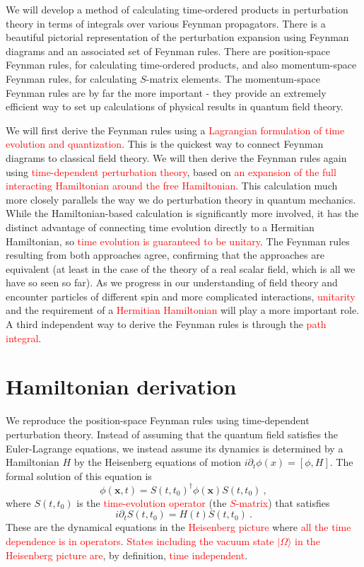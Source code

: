 \documentclass[11pt,a4paper]{article}
\renewcommand{\vec}[1]{\boldsymbol{#1}}
\newcounter{theo}[section]\setcounter{theo}{0}
\begin{document}
We will develop a method of calculating time-ordered products in perturbation theory in terms of integrals over various Feynman propagators. There is a beautiful pictorial representation of the perturbation expansion using Feynman diagrams and an associated set of Feynman rules. There are position-space Feynman rules, for calculating time-ordered products, and also momentum-space Feynman rules, for calculating $S$-matrix elements. The momentum-space Feynman rules are by far the more important - they provide an extremely efficient way to set up calculations of physical results in quantum field theory. 

We will first derive the Feynman rules using a \textcolor{red}{Lagrangian formulation of time evolution and quantization}. This is the quickest way to connect Feynman diagrams to classical field theory. We will then derive the Feynman rules again using \textcolor{red}{time-dependent perturbation theory}, based on \textcolor{red}{an expansion of the full interacting Hamiltonian around the free Hamiltonian}. This calculation much more closely parallels the way we do perturbation theory in quantum mechanics. While the Hamiltonian-based calculation is significantly more involved, it has the distinct advantage of connecting time evolution directly to a Hermitian Hamiltonian, so \textcolor{red}{time evolution is guaranteed to be unitary}. The Feynman rules resulting from both approaches agree, confirming that the approaches are equivalent (at least in the case of the theory of a real scalar field, which is all we have so seen so far). As we progress in our understanding of field theory and encounter particles of different spin and more complicated interactions, \textcolor{red}{unitarity} and the requirement of a \textcolor{red}{Hermitian Hamiltonian} will play a more important role. A third independent way to derive the Feynman rules is through the \textcolor{red}{path integral}.

\section{Hamiltonian derivation}
\cite{2014qfts.book.....S} We reproduce the position-space Feynman rules using time-dependent perturbation theory. Instead of assuming that the quantum field satisfies the Euler-Lagrange equations, we instead assume its dynamics is determined by a Hamiltonian $H$ by the Heisenberg equations of motion $i \partial_t \phi(x) = [\phi, H]$. The formal solution of this equation is
\begin{equation}
 \phi(\vec{x}, t) = S(t, t_0)^\dagger \phi(\vec{x}) S(t, t_0) ~,
\end{equation}
where $S(t, t_0)$ is the \textcolor{red}{time-evolution operator} (the \textcolor{red}{$S$-matrix}) that satisfies
\begin{equation}
i \partial_t S(t, t_0) = H(t) S(t, t_0) ~.
\end{equation}
These are the dynamical equations in the \textcolor{red}{Heisenberg picture} where \textcolor{red}{all the time dependence is in operators}. \textcolor{red}{States including the vacuum state $|\Omega \rangle$ in the Heisenberg picture are}, by definition, \textcolor{red}{time independent}.
\end{document}
